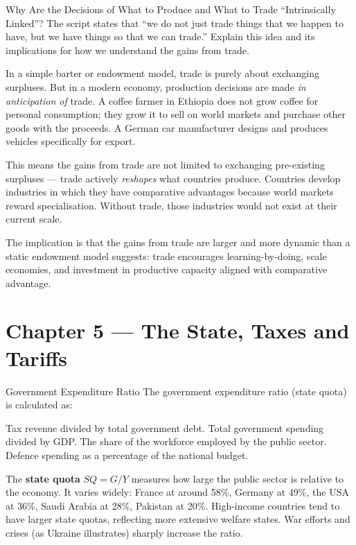 \documentclass[paper=a5]{scrartcl}
\begin{document}
\begin{question}[type=open]{Why Are the Decisions of What to Produce and What to
  Trade ``Intrinsically Linked''?}
The script states that ``we do not just trade things that we happen to have,
but we have things so that we can trade.'' Explain this idea and its
implications for how we understand the gains from trade.

\answerlines[6]

\begin{solution}
  In a simple barter or endowment model, trade is purely about exchanging
  surpluses. But in a modern economy, production decisions are made
  \emph{in anticipation of} trade. A coffee farmer in Ethiopia does not
  grow coffee for personal consumption; they grow it to sell on world
  markets and purchase other goods with the proceeds. A German car
  manufacturer designs and produces vehicles specifically for export.

  This means the gains from trade are not limited to exchanging pre-existing
  surpluses --- trade actively \emph{reshapes} what countries produce. Countries
  develop industries in which they have comparative advantages because world
  markets reward specialisation. Without trade, those industries would not
  exist at their current scale.

  The implication is that the gains from trade are larger and more dynamic
  than a static endowment model suggests: trade encourages learning-by-doing,
  scale economies, and investment in productive capacity aligned with
  comparative advantage.
\end{solution}
\end{question}



\section{Chapter 5 — The State, Taxes and Tariffs}

\begin{question}[type=mc]{Government Expenditure Ratio}
The government expenditure ratio (state quota) is calculated as:
\begin{choices}
  \choice        Tax revenue divided by total government debt.
  \correctchoice Total government spending divided by GDP.
  \choice        The share of the workforce employed by the public sector.
  \choice        Defence spending as a percentage of the national budget.
\end{choices}
\begin{solution}
  The \textbf{state quota} $SQ = G / Y$ measures how large the public
  sector is relative to the economy. It varies widely: France at around 58\%,
  Germany at 49\%, the USA at 36\%, Saudi Arabia at 28\%, Pakistan at 20\%.
  High-income countries tend to have larger state quotas, reflecting more
  extensive welfare states. War efforts and crises (as Ukraine illustrates)
  sharply increase the ratio.
\end{solution}
\end{question}
\end{document}
